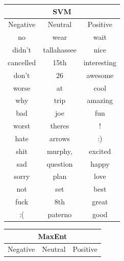 \begin{table}[t!]
\small
	\begin{minipage}{.45\linewidth}
		\begin{tabular}{|c|c|c|}
		
		\multicolumn{3}{c}{SVM} \\ \hline

		Negative & Neutral & Positive \\ \hline\hline

		no  		& wear & wait \\ \hline
		didn't  	& tallahassee & nice \\ \hline
		cancelled  	& 15th & interesting \\ \hline
		don't  		& 26 & awesome \\ \hline
		worse  		& at & cool \\ \hline
		why  		& trip & amazing \\ \hline
		bad  		& joe & fun \\ \hline
		worst  		& theres & ! \\ \hline
		hate  		& arrows & :) \\ \hline
		shit  		& murphy, & excited \\ \hline
		sad  		& question & happy \\ \hline
		sorry  		& plan & love \\ \hline
		not  		& set & best \\ \hline
		fuck  		& 8th & great \\ \hline
		:(  		& paterno & good \\ \hline
		\end{tabular}
	\end{minipage}
	\hspace{0.05\linewidth}
	\begin{minipage}{.45\linewidth}
		\begin{tabular}{|c|c|c|}		
		\multicolumn{3}{c}{MaxEnt} \\ \hline

		Negative & Neutral & Positive \\ \hline\hline


\end{tabular}
\end{minipage}
\end{table}
